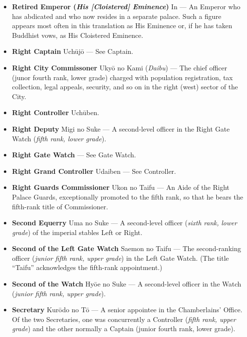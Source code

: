 \documentclass{article}
\begin{document}
\begin{multicols}{2}
\begin{small}
\begin{itemize}[
				label=,
				leftmargin=0em,
				rightmargin=-1.5em,
				itemindent=-2em,
			]
			\item \textbf{Retired Emperor (\textit{His [Cloistered] Eminence})} In --- An Emperor who has abdicated and who now resides in a separate palace. Such a figure appears most often in this translation as His Eminence or, if he has taken Buddhist vows, as His Cloistered Eminence.

			\item \textbf{Right Captain} Uchūjō --- See Captain.

			\item \textbf{Right City Commissoner} Ukyō no Kami (\textit{Daibu}) --- The chief officer (junor fourth rank, lower grade) charged with population registration, tax collection, legal appeals, security, and so on in the right (west) sector of the City.

			\item \textbf{Right Controller} Uchūben.

			\item \textbf{Right Deputy} Migi no Suke --- A second-level officer in the Right Gate Watch (\textit{fifth rank, lower grade}).

			\item \textbf{Right Gate Watch} --- See Gate Watch.

			\item \textbf{Right Grand Controller} Udaiben --- See Controller.

			\item \textbf{Right Guards Commissioner} Ukon no Taifu ---  An Aide of the Right Palace Guards, exceptionally promoted to the fifth rank, so that he bears the fifth-rank title of Commissioner.

			\item \textbf{Second Equerry} Uma no Suke --- A second-level officer (\textit{sixth rank, lower grade}) of the imperial stables Left or Right.

			\item \textbf{Second of the Left Gate Watch} Saemon no Taifu --- The second-ranking officer (\textit{junior fifth rank, upper grade}) in the Left Gate Watch. (The title “Taifu” acknowledges the fifth-rank appointment.)

			\item \textbf{Second of the Watch} Hyōe no Suke --- A second-level officer in the Watch (\textit{junior fifth rank, upper grade}).

			\item \textbf{Secretary} Kurōdo no Tō --- A senior appointee in the Chamberlains' Office. Of the two Secretaries, one was concurrently a Controller (\textit{fifth rank, upper grade}) and the other normally a Captain (junior fourth rank, lower grade).


\end{itemize}
\end{small}
\end{multicols}
\end{document}
